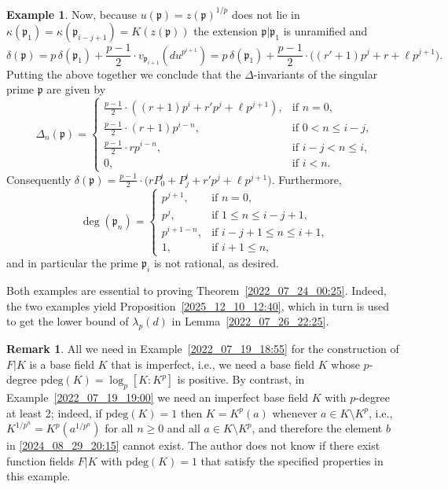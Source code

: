 \documentclass[12pt,reqno]{amsart}%
\theoremstyle{definition}
\newtheorem{example}[prop]{Example}
\newtheorem{rem}[prop]{Remark}
\theoremstyle{remark}
\newcommand{\pp}{\mathfrak{p}}
\newcommand{\de}{\delta}
\newcommand{\De}{\Delta}
\newcommand{\ka}{\kappa}
\newcommand{\lam}{\lambda}
\begin{document}
\begin{example}
Now, because $u(\pp) = z(\pp)^{1/p}$ does not lie in $\ka({\pp_1}) = \ka(\pp_{i-j+1}) = K(z(\pp))$ 
the extension $\pp|\pp_1$ is unramified and
\[ \de(\pp) = p \, \de(\pp_1) + \frac{p-1}2 \cdot v_{\pp_{i+1}} (du^{p^{i+1}}) = p \, \de(\pp_1) +  \frac{p-1}2 \cdot \big( (r'+1) p^j + r + \ell p^{j+1} \big). \]
Putting the above together we conclude that the $\De$-invariants of the singular prime $\pp$ are given by
\[ \De_n(\pp) =
\begin{cases}
    \frac{p-1}2 \cdot ((r+1)p^i + r' p^j + \ell p^{j+1}), & \text{if $n=0$,} \\
    \frac{p-1}2 \cdot (r + 1) p^{i-n}, & \text{if $0 < n \leq i-j$,} \\
    \frac{p-1}2 \cdot r p^{i-n}, & \text{if $i-j < n \leq i$,} \\
    0, & \text{if $i<n$.}
\end{cases}
\]
Consequently $\de(\pp) = \frac{p-1}2 \cdot \big( r P_0^i + P_j^i + r' p^j + \ell p^{j+1} \big)$. Furthermore,
\[ \deg(\pp_n) = 
\begin{cases}
    p^{j+1}, & \text{if $n=0$,} \\
    p^j, & \text{if $1 \leq n\leq i-j+1$,} \\
    p^{i+1-n}, & \text{if $i-j+1 \leq n \leq i+1$,} \\
    1, & \text {if $i+1 \leq n$,}
\end{cases}
\]
and in particular the prime $\pp_i$ is not rational, as desired.
\end{example}


Both examples are essential to proving Theorem~\ref{2022_07_24_00:25}.
Indeed, the two examples yield Proposition~\ref{2025_12_10_12:40}, which in turn is used to get the lower bound of $\lam_p(d)$ in Lemma~\ref{2022_07_26_22:25}.

\begin{rem}\label{2025_05_21_23:20}
All we need in Example~\ref{2022_07_19_18:55} for the construction of $F|K$ is a base field $K$ that is imperfect, i.e., we need a base field $K$ whose $p$-degree $\mathrm{pdeg}(K) = \log_p [K:K^p]$ is positive.
By contrast, in Example~\ref{2022_07_19_19:00} we need an imperfect base field $K$ with $p$-degree at least 2; indeed, if $\mathrm{pdeg}(K)=1$ then $K=K^p(a)$ whenever $a\in K\setminus K^p$, i.e., $K^{1/p^n}=K^p(a^{1/p^{n}})$ for all $n\geq 0$ and all $a\in K\setminus K^p$, and therefore the element $b$ in \eqref{2024_08_29_20:15} cannot exist.
The author does not know if there exist function fields $F|K$ with $\mathrm{pdeg}(K)=1$ that satisfy the specified properties in this example.
\end{rem}
\end{document}
